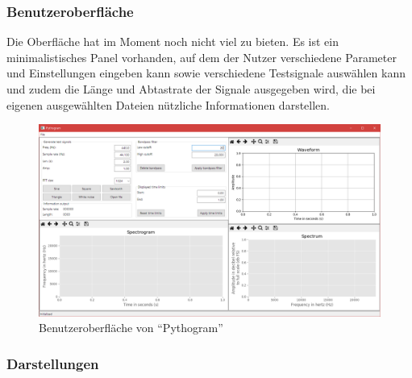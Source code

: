 \documentclass[a4paper]{article}
\begin{document}
\subsubsection{Benutzeroberfläche}

Die Oberfläche hat im Moment noch nicht viel zu bieten. Es ist ein minimalistisches Panel vorhanden, auf dem der Nutzer verschiedene Parameter und Einstellungen eingeben kann sowie verschiedene Testsignale auswählen kann und zudem die Länge und Abtastrate der Signale ausgegeben wird, die bei eigenen ausgewählten Dateien nützliche Informationen darstellen.
\vspace{2em}
\begin{figure}[H]
    \centering
    \begin{minipage}{1.0\textwidth}
        \centering
        \includegraphics[width=1.0\textwidth]{GUI.png}
        \caption{Benutzeroberfläche von "`Pythogram"'}
    \end{minipage}
\end{figure}

\subsubsection{Darstellungen}
\end{document}
